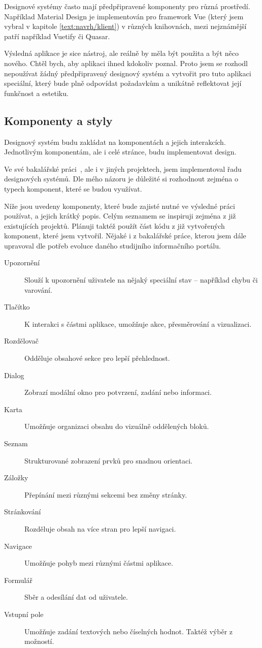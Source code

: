 Designové systémy často mají předpřipravené komponenty pro různá prostředí. 
Například Material Design je implementován pro framework Vue (který jsem vybral v kapitole \ref{text:navrh/klient}) v různých knihovnách, mezi nejznámější patří například Vuetify či Quasar.

Výsledná aplikace je sice nástroj, ale reálně by měla být použita a být něco nového. 
Chtěl bych, aby aplikaci ihned kdokoliv poznal. 
Proto jsem se rozhodl nepoužívat žádný předpřipravený designový systém a vytvořit pro tuto aplikaci speciální, který bude plně odpovídat požadavkům a unikátně reflektovat její funkčnost a estetiku.

\subsection{Komponenty a styly}\label{text:navrh/desgin/komponenty}\label{text:navrh/design/komponenty}

Designový systém budu zakládat na komponentách a jejich interakcích.
Jednotlivým komponentám, ale i celé stránce, budu implementovat design.

Ve své bakalářské práci~\cite{cajthaml_bp}, ale i v jiných projektech, jsem implementoval řadu designových systémů.
Dle mého názoru je důležité si rozhodnout zejména o typech komponent, které se budou využívat.

Níže jsou uvedeny komponenty, které bude zajisté nutné ve výsledné práci používat, a jejich krátký popis.
Celým seznamem se inspiruji zejména z již existujících projektů.
Plánuji taktéž použít část kódu z již vytvořených komponent, které jsem vytvořil.
Nějaké i z bakalářské práce, kterou jsem dále upravoval dle potřeb evoluce daného studijního informačního portálu. 

\begin{description} 
    \item[Upozornění] Slouží k upozornění uživatele na nějaký speciální stav – například chybu či varování. 
    \item[Tlačítko] K interakci s částmi aplikace, umožňuje akce, přesměrování a vizualizaci. 
    \item[Rozdělovač] Odděluje obsahové sekce pro lepší přehlednost. 
    \item[Dialog] Zobrazí modální okno pro potvrzení, zadání nebo informaci. 
    \item[Karta] Umožňuje organizaci obsahu do vizuálně oddělených bloků. 
    \item[Seznam] Strukturované zobrazení prvků pro snadnou orientaci. 
    \item[Záložky] Přepínání mezi různými sekcemi bez změny stránky. 
    \item[Stránkování] Rozděluje obsah na více stran pro lepší navigaci. 
    \item[Navigace] Umožňuje pohyb mezi různými částmi aplikace. 
    \item[Formulář] Sběr a odesílání dat od uživatele. 
    \item[Vstupní pole] Umožňuje zadání textových nebo číselných hodnot. Taktéž výběr z možností.
\end{description}

